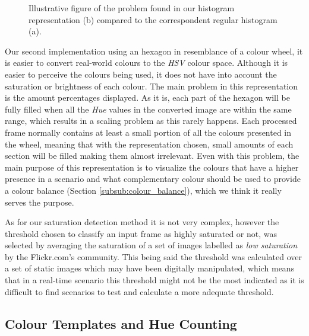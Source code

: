 \begin{figure}[htb]
	\centering
  	\caption{Illustrative figure of the problem found in our histogram representation (b) compared to the correspondent regular histogram (a).}
	\label{fig:disc_hist}
\end{figure}

Our second implementation using an hexagon in resemblance of a colour wheel, it is easier to convert real-world colours to the \emph{HSV} colour space. Although it is easier to perceive the colours being used, it does not have into account the saturation or brightness of each colour. 
The main problem in this representation is the amount percentages displayed. As it is, each part of the hexagon will be fully filled when all the \emph{Hue} values in the converted image are within the same range, which results in a scaling problem as this rarely happens. Each processed frame normally contains at least a small portion of all the colours presented in the wheel, meaning that with the representation chosen, small amounts of each section will be filled making them almost irrelevant. Even with this problem, the main purpose of this representation is to visualize the colours that have a higher presence in a scenario and what complementary colour should be used to provide a colour balance (Section \ref{subsub:colour_balance}), which we think it really serves the purpose.


As for our saturation detection method it is not very complex, however the threshold chosen to classify an input frame as highly saturated or not, was selected by averaging the saturation of a set of images labelled as \emph{low saturation} by the Flickr.com's community. This being said the threshold was calculated over a set of static images which may have been digitally manipulated, which means that in a real-time scenario this threshold might not be the most indicated as it is difficult to find scenarios to test and calculate a more adequate threshold.

\subsection{Colour Templates and Hue Counting}
\label{sub:color}

